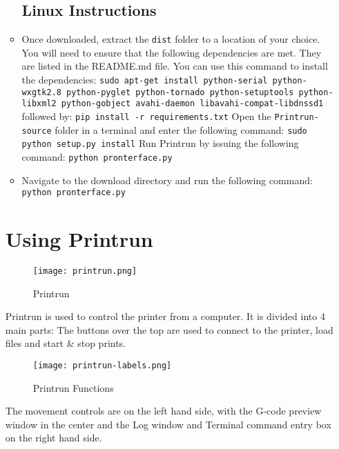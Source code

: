 \begin{enumerate}
\begin{itemize}
\subsection{Linux Instructions}
\item Once downloaded, extract the \texttt{dist} folder to a location of your choice. You will need to ensure that the following dependencies are met. They are listed in the README.md file. You can use this command to install the dependencies: 
\texttt{sudo apt-get install python-serial python-wxgtk2.8 python-pyglet python-tornado python-setuptools python-libxml2 python-gobject avahi-daemon libavahi-compat-libdnssd1}
followed by:
\texttt{pip install -r requirements.txt}
Open the \texttt{Printrun-source} folder in a terminal and enter the following command:
\texttt{sudo python setup.py install}
Run Printrun by issuing the following command:
\texttt{python pronterface.py}
\item Navigate to the download directory and run the following command:
\texttt{python pronterface.py}
\end{itemize}

\section{Using Printrun}

\begin{figure}[H]
\centering
\texttt{[image: printrun.png]}
\caption{Printrun}
\label{fig:printrun}
\end{figure}


Printrun is used to control the printer from a computer. It is divided into 4 main parts: The buttons over the top are used to connect to the printer, load files and start \& stop prints.

\begin{figure}[H]
\centering
\texttt{[image: printrun-labels.png]}
\caption{Printrun Functions}
\label{fig:printrun-labels}
\end{figure}

The movement controls are on the left hand side, with the G-code preview window in the center and the Log window and Terminal command entry box on the right hand side.


\end{enumerate}
